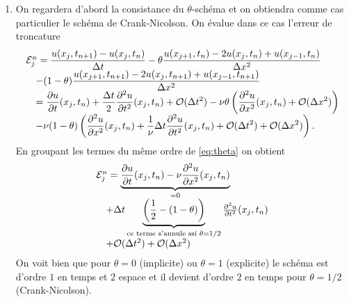 \documentclass[12pt,a4paper]{article}
\begin{document}
\begin{enumerate}
\item On regardera d'abord la consistance du
  $\theta$-sch\'ema et on obtiendra comme cas particulier le sch\'ema de Crank-Nicolson. On \'evalue dans ce cas l'erreur de troncature
\begin{equation}\label{eq:theta}
\begin{array}{l}
{\cal E}^n_j=\displaystyle \frac{u(x_j,t_{n+1})-u(x_j,t_n)}{\Delta t} -\displaystyle\theta
\frac{u(x_{j+1},t_n)-2u(x_j,t_n)+u(x_{j-1},t_n)}{\Delta  x^2}\\
\quad-\displaystyle (1-\theta) \frac{u(x_{j+1},t_{n+1})-2u(x_j,t_{n+1})+u(x_{j-1},t_{n+1})}{\Delta
  x^2}\\
\quad = \displaystyle\frac{\partial u}{\partial t}(x_j,t_n) + \frac{\Delta t}{2}
\frac{\partial^2 u}{\partial t^2}(x_j,t_n)+{\cal O}(\Delta t^2)-\displaystyle\nu\theta \left( \frac{\partial^2 u}{\partial
  x^2}(x_j,t_n)+{\cal O}(\Delta x^2)\right)\\
\quad -\displaystyle\nu(1-\theta) \left(\frac{\partial^2 u}{\partial
  x^2}(x_j,t_n)+  \frac{1}{\nu} \Delta t \frac{\partial^2 u}{\partial
  t^2}(x_j,t_n)+{\cal O}(\Delta t^2) + {\cal O}(\Delta x^2)\right).
\end{array}
\end{equation}
En groupant les termes du m\^eme
ordre de \eqref{eq:theta} on obtient
$$
\begin{array}{l}
{\cal E}^n_j =\displaystyle \underbrace{\frac{\partial u}{\partial t}(x_j,t_n) -  \nu\frac{\partial^2
  u}{\partial x^2}(x_j,t_n)}_{=0}\\[2ex]
\quad + \Delta t \underbrace{\left(\frac{1}{2} -(1-\theta) \right)}_{\text{ce terme s'annule ssi } \theta = 1/2} \frac{\partial^2
  u}{\partial t^2}(x_j,t_n)  \\[2ex]
\quad  + {\cal O}(\Delta t^2) + {\cal O}(\Delta x^2)
\end{array}
$$
On voit bien que pour $\theta=0$ (implicite) ou $\theta=1$
(explicite) le sch\'ema est d'ordre $1$ en temps et $2$ espace et il
devient d'ordre $2$ en temps pour $\theta=1/2$ (Crank-Nicolson).


\end{enumerate}
\end{document}
